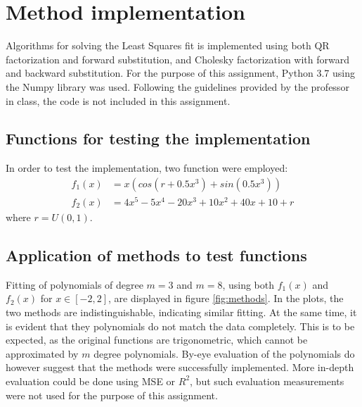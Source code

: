 \documentclass[%
oneside,                 %
final,                   %
10pt]{article}
\begin{document}
\section{Method implementation}
Algorithms \cite{MF3} \cite{MF4} for solving the Least Squares fit is implemented using both QR factorization and forward substitution, and Cholesky factorization with forward and backward substitution. For the purpose of this assignment, Python 3.7 using the Numpy library was used. Following the guidelines provided by the professor in class, the code is not included in this assignment. 

\subsection{Functions for testing the implementation}
In order to test the implementation, two function were employed: 
\begin{align}
f_1(x)&= x (cos(r+0.5x^3)+sin(0.5x^3)) \\
f_2(x)& = 4x^5- 5x^4 - 20x^3 + 10x^2 + 40x + 10 + r
\end{align}
where $r=\mathit{U}(0,1)$.  

\subsection{Application of methods to test functions}
Fitting of polynomials of degree $m=3$ and $m=8$, using both $f_1(x)$ and $f_2(x)$ for $x\in[-2,2]$, are displayed in figure \ref{fig:methods}. In the plots, the two methods are indistinguishable, indicating similar fitting. At the same time, it is evident that they polynomials do not match the data completely. This is to be expected, as the original functions are trigonometric, which cannot be approximated by $m$ degree polynomials. By-eye evaluation of the polynomials do however suggest that the methods were successfully implemented. More in-depth evaluation could be done using MSE or $R^2$, but such evaluation measurements were not used for the purpose of this assignment.
\end{document}
